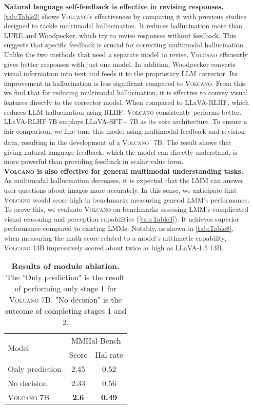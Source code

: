 \documentclass[11pt]{article}
\newcommand{\Ours}{\textsc{Volcano}}
\begin{document}
\textbf{Natural language self-feedback is effective in revising responses.} \autoref{tab:Table2} shows {\Ours}'s effectiveness by comparing it with previous studies designed to tackle multimodal hallucination. It reduces hallucination more than LURE and Woodpecker, which try to revise responses without feedback. This suggests that specific feedback is crucial for correcting multimodal hallucination. Unlike the two methods that need a separate model to revise, {\Ours} efficiently gives better responses with just one model. In addition, Woodpecker converts visual information into text and feeds it to the proprietary LLM corrector. Its improvement in hallucination is less significant compared to {\Ours}. From this, we find that for reducing multimodal hallucination, it is effective to convey visual features directly to the corrector model. When compared to LLaVA-RLHF, which reduces LLM hallucination using RLHF, {\Ours} consistently performs better. LLaVA-RLHF 7B employs LLaVA-SFT+ 7B as its core architecture. To ensure a fair comparison, we fine-tune this model using multimodal feedback and revision data, resulting in the development of a {\Ours}\textsuperscript{--} 7B. The result shows that giving natural language feedback, which the model can directly understand, is more powerful than providing feedback in scalar value form. \\
\textbf{{\Ours} is also effective for general multimodal understanding tasks.} As multimodal hallucination decreases, it is expected that the LMM can answer user questions about images more accurately. In this sense, we anticipate that {\Ours} would score high in benchmarks measuring general LMM's performance. To prove this, we evaluate {\Ours} on benchmarks assessing LMM's complicated visual reasoning and perception capabilities (\autoref{tab:Table3}). It achieves superior performance compared to existing LMMs. Notably, as shown in \autoref{tab:Table8}, when measuring the math score related to a model's arithmetic capability, {\Ours} 13B impressively scored about twice as high as LLaVA-1.5 13B.
\begin{table}[h]
\centering
\small
\begin{tabular}{lcc}
\toprule
\multirow{2}{*}{Model} & \multicolumn{2}{c}{MMHal-Bench} \\
& Score  & Hal rate   \\
\midrule
Only prediction  & 2.45 & 0.52  \\
No decision & 2.33	& 0.56  \\
{\Ours} 7B & \textbf{2.6} & \textbf{0.49} \\
\bottomrule
\end{tabular}
\caption{\textbf{Results of module ablation.}   The "Only prediction" is the result of performing only stage 1 for {\Ours} 7B. "No decision" is the outcome of completing stages 1 and 2.}
\label{tab:Table4}
\end{table}
\end{document}

